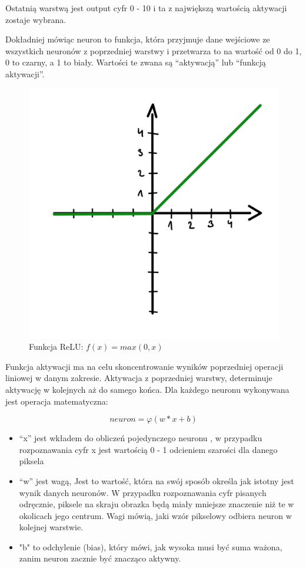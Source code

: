 \documentclass[brudnopis]{xmgr}
\begin{document}
Ostatnią warstwą jest output cyfr 0 - 10 i ta z największą wartością aktywacji zostaje wybrana. 

Dokładniej mówiąc neuron to funkcja, która przyjmuje dane wejściowe ze wszystkich neuronów z poprzedniej warstwy i przetwarza to na wartość od 0 do 1, 0 to czarny, a 1 to biały. Wartości te zwana są “aktywacją” lub “funkcją aktywacji”.

\begin{figure}[!tbh]
\centering
\includegraphics[width=.8\hsize]{fig/4}
\caption{Funkcja ReLU: $f(x) = max(0, x)$\label{RYS.3}}
\end{figure}

Funkcja aktywacji ma na celu skoncentrowanie wyników poprzedniej operacji liniowej w danym zakresie.
Aktywacja z poprzedniej warstwy, determinuje aktywację w kolejnych aż do samego końca. 
Dla każdego neuronu wykonywana jest operacja matematyczna:

\begin{equation}
neuron  = φ (w * x + b)
\end{equation}

\begin{itemize}
\item “x” jest wkładem do obliczeń pojedynczego neuronu , w przypadku rozpoznawania cyfr x jest wartością 0 - 1 odcieniem szarości dla danego piksela
\item “w” jest wagą, Jest to wartość, która na swój sposób określa jak istotny jest wynik danych neuronów. W przypadku rozpoznawania cyfr pisanych odręcznie, piksele na skraju obrazka będą miały mniejsze znaczenie niż te w okolicach jego centrum. Wagi mówią, jaki wzór pikselowy odbiera neuron w kolejnej warstwie.
\item "b" to odchylenie (bias), który mówi, jak wysoka musi być suma ważona, zanim neuron zacznie być znacząco aktywny.
\end{itemize}
\end{document}
